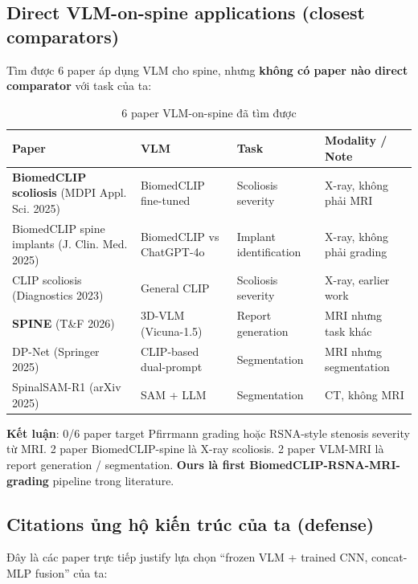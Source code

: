\documentclass[11pt,a4paper]{article}
\newcommand{\bad}[1]{\textcolor{bad}{#1}}
\begin{document}
\subsection{Direct VLM-on-spine applications (closest comparators)}

\noindent Tìm được 6 paper áp dụng VLM cho spine, nhưng \textbf{không
có paper nào direct comparator} với task của ta:

\begin{table}[h]
\centering
\caption{6 paper VLM-on-spine đã tìm được}
\small
\begin{tabular}{@{}p{4.5cm}p{2.5cm}p{2cm}p{4cm}@{}}
\toprule
\rowcolor{tablehdr}
Paper & VLM & Task & Modality / Note \\
\midrule
\textbf{BiomedCLIP scoliosis} (MDPI Appl. Sci. 2025) & BiomedCLIP fine-tuned & Scoliosis severity & \bad{X-ray, không phải MRI} \\
BiomedCLIP spine implants (J. Clin. Med. 2025) & BiomedCLIP vs ChatGPT-4o & Implant identification & \bad{X-ray, không phải grading} \\
CLIP scoliosis (Diagnostics 2023) & General CLIP & Scoliosis severity & X-ray, earlier work \\
\textbf{SPINE} (T\&F 2026) & 3D-VLM (Vicuna-1.5) & \bad{Report generation} & MRI nhưng task khác \\
DP-Net (Springer 2025) & CLIP-based dual-prompt & \bad{Segmentation} & MRI nhưng segmentation \\
SpinalSAM-R1 (arXiv 2025) & SAM + LLM & \bad{Segmentation} & CT, không MRI \\
\bottomrule
\end{tabular}
\end{table}

\noindent\textbf{Kết luận}: 0/6 paper target Pfirrmann grading hoặc
RSNA-style stenosis severity từ MRI. 2 paper BiomedCLIP-spine là
X-ray scoliosis. 2 paper VLM-MRI là report generation / segmentation.
\textbf{Ours là first BiomedCLIP-RSNA-MRI-grading} pipeline trong
literature.

\subsection{Citations ủng hộ kiến trúc của ta (defense)}

\noindent Đây là các paper trực tiếp justify lựa chọn ``frozen VLM +
trained CNN, concat-MLP fusion'' của ta:
\end{document}
